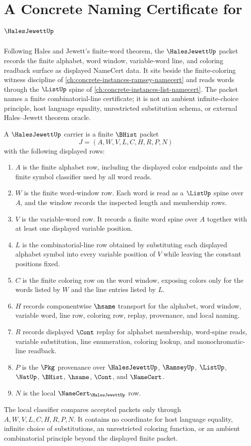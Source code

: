 \chapter{A Concrete Naming Certificate for $\HalesJewettUp$}
\label{ch:concrete-instances-hales-jewett-namecert}

Following Hales and Jewett's finite-word theorem, the $\HalesJewettUp$ packet records the finite alphabet, word window, variable-word line, and coloring readback surface as displayed NameCert data. It sits beside the finite-coloring witness discipline of \autoref{ch:concrete-instances-ramsey-namecert} and reads words through the $\ListUp$ spine of \autoref{ch:concrete-instances-list-namecert}. The packet names a finite combinatorial-line certificate; it is not an ambient infinite-choice principle, host language equality, unrestricted substitution schema, or external Hales--Jewett theorem oracle.

\begin{definition}
\label{def:hales-jewett-carrier}
A $\HalesJewettUp$ carrier is a finite $\BHist$ packet
$$
J=(A,W,V,L,C,H,R,P,N)
$$
with the following displayed rows:
\begin{enumerate}
\item $A$ is the finite alphabet row, including the displayed color endpoints and the finite symbol classifier used by all word reads.
\item $W$ is the finite word-window row. Each word is read as a $\ListUp$ spine over $A$, and the window records the inspected length and membership rows.
\item $V$ is the variable-word row. It records a finite word spine over $A$ together with at least one displayed variable position.
\item $L$ is the combinatorial-line row obtained by substituting each displayed alphabet symbol into every variable position of $V$ while leaving the constant positions fixed.
\item $C$ is the finite coloring row on the word window, exposing colors only for the words listed by $W$ and the line entries listed by $L$.
\item $H$ records componentwise $\hsame$ transport for the alphabet, word window, variable word, line row, coloring row, replay, provenance, and local naming.
\item $R$ records displayed $\Cont$ replay for alphabet membership, word-spine reads, variable substitution, line enumeration, coloring lookup, and monochromatic-line readback.
\item $P$ is the $\Pkg$ provenance over $\HalesJewettUp$, $\RamseyUp$, $\ListUp$, $\NatUp$, $\BHist$, $\hsame$, $\Cont$, and $\NameCert$.
\item $N$ is the local $\NameCert_{\HalesJewettUp}$ row.
\end{enumerate}
The local classifier compares accepted packets only through $A,W,V,L,C,H,R,P,N$. It contains no coordinate for host language equality, infinite choice of substitutions, an unrestricted coloring function, or an ambient combinatorial principle beyond the displayed finite packet.
\end{definition}

